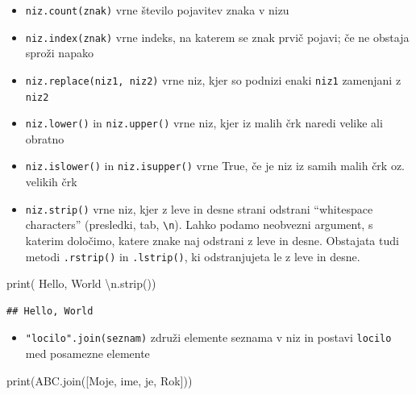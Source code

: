 \documentclass[
]{report}
\newenvironment{Shaded}{\begin{snugshade}}{\end{snugshade}}
\newcommand{\BuiltInTok}[1]{#1}
\newcommand{\CharTok}[1]{\textcolor[rgb]{0.31,0.60,0.02}{#1}}
\newcommand{\NormalTok}[1]{#1}
\newcommand{\StringTok}[1]{\textcolor[rgb]{0.31,0.60,0.02}{#1}}
\providecommand{\tightlist}{%
  \setlength{\itemsep}{0pt}\setlength{\parskip}{0pt}}
\begin{document}
\begin{itemize}
\tightlist
\item
  \texttt{niz.count(znak)} vrne število pojavitev znaka v nizu
\item
  \texttt{niz.index(znak)} vrne indeks, na katerem se znak prvič pojavi; če ne obstaja sproži napako
\item
  \texttt{niz.replace(niz1,\ niz2)} vrne niz, kjer so podnizi enaki \texttt{niz1} zamenjani z \texttt{niz2}
\item
  \texttt{niz.lower()} in \texttt{niz.upper()} vrne niz, kjer iz malih črk naredi velike ali obratno
\item
  \texttt{niz.islower()} in \texttt{niz.isupper()} vrne True, če je niz iz samih malih črk oz. velikih črk
\item
  \texttt{niz.strip()} vrne niz, kjer z leve in desne strani odstrani ``whitespace characters'' (presledki, tab, \texttt{\textbackslash{}n}). Lahko podamo neobvezni argument, s katerim določimo, katere znake
  naj odstrani z leve in desne. Obstajata tudi metodi \texttt{.rstrip()} in \texttt{.lstrip()}, ki odstranjujeta le z leve in desne.
\end{itemize}

\begin{Shaded}
\begin{Highlighting}[]
\BuiltInTok{print}\NormalTok{(}\StringTok{\textquotesingle{}    Hello, World    }\CharTok{\textbackslash{}n}\StringTok{\textquotesingle{}}\NormalTok{.strip())}
\end{Highlighting}
\end{Shaded}

\begin{verbatim}
## Hello, World
\end{verbatim}

\begin{itemize}
\tightlist
\item
  \texttt{"locilo".join(seznam)} združi elemente seznama v niz in postavi \texttt{locilo}
  med posamezne elemente
\end{itemize}

\begin{Shaded}
\begin{Highlighting}[]
\BuiltInTok{print}\NormalTok{(}\StringTok{\textquotesingle{}ABC\textquotesingle{}}\NormalTok{.join([}\StringTok{\textquotesingle{}Moje\textquotesingle{}}\NormalTok{, }\StringTok{\textquotesingle{}ime\textquotesingle{}}\NormalTok{, }\StringTok{\textquotesingle{}je\textquotesingle{}}\NormalTok{, }\StringTok{\textquotesingle{}Rok\textquotesingle{}}\NormalTok{]))}
\end{Highlighting}
\end{Shaded}
\end{document}
